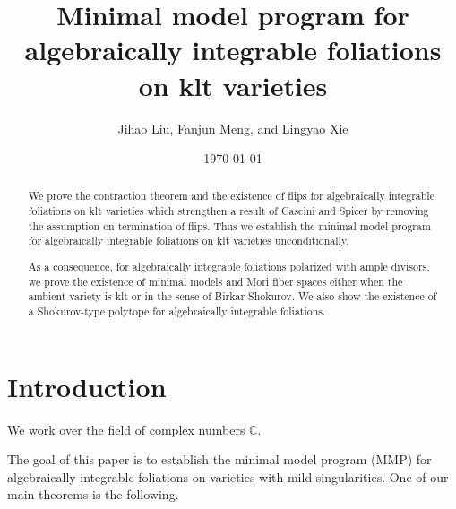 \documentclass[11pt]{amsart}
\numberwithin{equation}{section}
\theoremstyle{definition}
\theoremstyle{definition}
\theoremstyle{definition}
\begin{document}
\title{Minimal model program for algebraically integrable foliations on klt varieties}
\author{Jihao Liu, Fanjun Meng, and Lingyao Xie}

\date{\today}

\begin{abstract}
We prove the contraction theorem and the existence of flips for algebraically integrable foliations on klt varieties which strengthen a result of Cascini and Spicer by removing the assumption on termination of flips. Thus we establish the minimal model program for algebraically integrable foliations on klt varieties unconditionally.

As a consequence, for algebraically integrable foliations polarized with ample divisors, we prove the existence of minimal models and Mori fiber spaces either when the ambient variety is klt or in the sense of Birkar-Shokurov. We also show the existence of a Shokurov-type polytope for algebraically integrable foliations.
\end{abstract}

\address{Department of Mathematics, Northwestern University, 2033 Sheridan Road, Evanston, IL 60208, USA}

\address{Department of Mathematics, Johns Hopkins University, 3400 N. Charles Street, Baltimore, MD 21218, USA}

\address{Department of Mathematics, The University of Utah, Salt Lake City, UT 84112, USA}

\maketitle

\pagestyle{myheadings}

\tableofcontents


\section{Introduction}\label{sec:Introduction}
We work over the field of complex numbers $\mathbb C$. 

The goal of this paper is to establish the minimal model program (MMP) for algebraically integrable foliations on varieties with mild singularities. One of our main theorems is the following.
\end{document}
